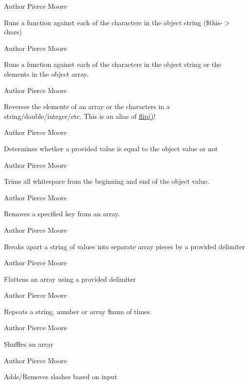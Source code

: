 \begin{DoxyAuthor}{Author}
Pierce Moore
\end{DoxyAuthor}
Runs a function against each of the characters in the object string (\$this-\/$>$chars)

\begin{DoxyAuthor}{Author}
Pierce Moore
\end{DoxyAuthor}
Runs a function against each of the characters in the object string or the elements in the object array.

\begin{DoxyAuthor}{Author}
Pierce Moore
\end{DoxyAuthor}
Reverses the elements of an array or the characters in a string/double/integer/etc. This is an alias of \hyperlink{index_8php_a976e7b3d05fce3934ce5bc7a635bcade}{flip()}!

\begin{DoxyAuthor}{Author}
Pierce Moore
\end{DoxyAuthor}
Determines whether a provided value is equal to the object value or not

\begin{DoxyAuthor}{Author}
Pierce Moore
\end{DoxyAuthor}
Trims all whitespace from the beginning and end of the object value.

\begin{DoxyAuthor}{Author}
Pierce Moore
\end{DoxyAuthor}
Removes a specified key from an array.

\begin{DoxyAuthor}{Author}
Pierce Moore
\end{DoxyAuthor}
Breaks apart a string of values into separate array pieces by a provided delimiter

\begin{DoxyAuthor}{Author}
Pierce Moore
\end{DoxyAuthor}
Flattens an array using a provided delimiter

\begin{DoxyAuthor}{Author}
Pierce Moore
\end{DoxyAuthor}
Repeats a string, number or array \$num of times.

\begin{DoxyAuthor}{Author}
Pierce Moore
\end{DoxyAuthor}
Shuffles an array

\begin{DoxyAuthor}{Author}
Pierce Moore
\end{DoxyAuthor}
Adds/\-Removes slashes based on input

